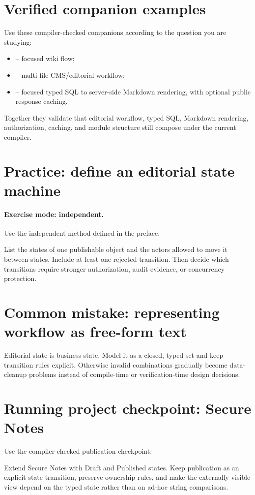 \section{Verified companion examples}
Use these compiler-checked companions according to the question you are studying:
\begin{itemize}
  \item {} -- focused wiki flow;
  \item {} -- multi-file CMS/editorial workflow;
  \item {} -- focused typed SQL to server-side Markdown rendering, with optional public response caching.
\end{itemize}
Together they validate that editorial workflow, typed SQL, Markdown rendering, authorization, caching, and module structure still compose under the current compiler.

\section{Practice: define an editorial state machine}
\paragraph{Exercise mode: independent.} Use the independent method defined in the preface.

List the states of one publishable object and the actors allowed to move it between states. Include at least one rejected transition. Then decide which transitions require stronger authorization, audit evidence, or concurrency protection.

\section{Common mistake: representing workflow as free-form text}
Editorial state is business state. Model it as a closed, typed set and keep transition rules explicit. Otherwise invalid combinations gradually become data-cleanup problems instead of compile-time or verification-time design decisions.

\section{Running project checkpoint: Secure Notes}
Use the compiler-checked publication checkpoint:
\begin{quote}\end{quote}
Extend Secure Notes with Draft and Published states. Keep publication as an explicit state transition, preserve ownership rules, and make the externally visible view depend on the typed state rather than on ad-hoc string comparisons.

